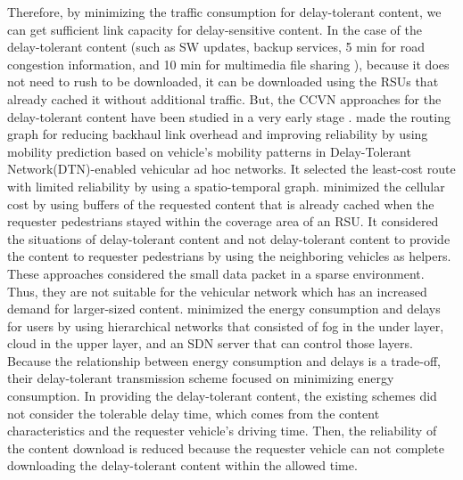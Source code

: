 \documentclass{ieeeaccess}
\begin{document}
Therefore, by minimizing the traffic consumption for delay-tolerant content, we can get sufficient link capacity for delay-sensitive content.
In the case of the delay-tolerant content (such as SW updates, backup services, 5 min for road congestion information, and 10 min for multimedia file sharing \cite{Lee2014, Chen2009}), because it does not need to rush to be downloaded, it can be downloaded using the RSUs that already cached it without additional traffic.
But, the CCVN approaches for the delay-tolerant content have been studied in a very early stage \cite{Qi2017, Vigneri2019, Xia2020, Prates2019, Aung2023}.
\cite{Qi2017} made the routing graph for reducing backhaul link overhead and improving reliability by using mobility prediction based on vehicle’s mobility patterns in Delay-Tolerant Network(DTN)-enabled vehicular ad hoc networks.
It selected the least-cost route with limited reliability by using a spatio-temporal graph.
\cite{Vigneri2019} minimized the cellular cost by using buffers of the requested content that is already cached when the requester pedestrians stayed within the coverage area of an RSU.
It considered the situations of delay-tolerant content and not delay-tolerant content to provide the content to requester pedestrians by using the neighboring vehicles as helpers.
These approaches considered the small data packet in a sparse environment.
Thus, they are not suitable for the vehicular network which has an increased demand for larger-sized content.
\cite{Xia2020} minimized the energy consumption and delays for users by using hierarchical networks that consisted of fog in the under layer, cloud in the upper layer, and an SDN server that can control those layers.
Because the relationship between energy consumption and delays is a trade-off, their delay-tolerant transmission scheme focused on minimizing energy consumption.
In providing the delay-tolerant content, the existing schemes did not consider the tolerable delay time, which comes from the content characteristics and the requester vehicle's driving time.
Then, the reliability of the content download is reduced because the requester vehicle can not complete downloading the delay-tolerant content within the allowed time.
\end{document}
